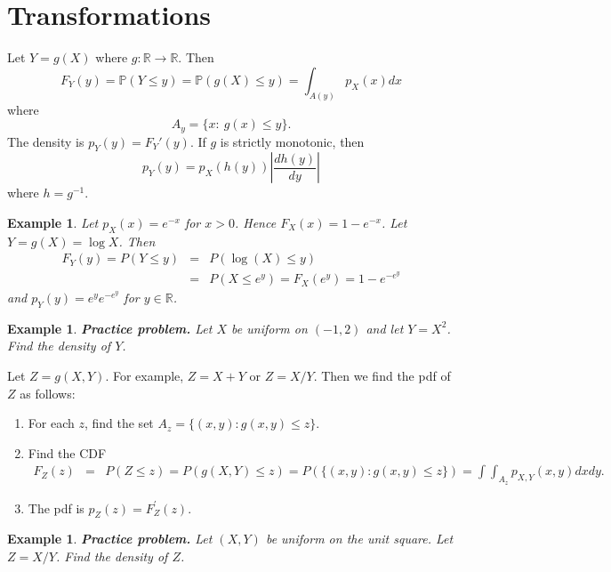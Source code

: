 \documentclass[twoside,12pt]{article}
\newtheorem{example}[theorem]{Example}
\begin{document}
\section{Transformations}

Let $Y=g(X)$
where $g:\mathbb{R}\to \mathbb{R}$.
Then
$$
F_Y(y) = \mathbb{P}(Y \leq y) = \mathbb{P}(g(X) \leq y) = \int_{A(y)} p_X(x) dx
$$
where
$$
A_y = \{ x:\ g(x) \leq y\}.
$$
The density is
$p_Y(y) = F_Y'(y)$.
If $g$ is strictly monotonic, then
$$
p_Y(y) =  p_X(h(y)) \left|\frac{d h(y)}{dy} \right|
$$
where $h=g^{-1}$.


\begin{example}
Let $p_X(x)=e^{-x}$ for $x>0$.  Hence
$F_X(x) = 1-e^{-x}$.  Let $Y=g(X) = \log X$.  Then 
\begin{eqnarray*} 
F_Y(y) = P(Y \leq y) &=& P(\log(X) \leq y) \\
&=& P(X \leq e^y) = F_X(e^y) = 1-e^{-e^y}
\end{eqnarray*}
and
$p_Y(y) = e^{y} e^{-e^y}$ for
$y\in \mathbb{R}$.
\end{example}


\begin{example}
{\bf Practice problem.}
Let $X$ be uniform on $(-1,2)$ and let
$Y = X^2$.
Find the density of $Y$.
\end{example}

\vspace{1cm}

Let $Z = g(X,Y)$.
For example,
$Z=X+Y$ or $Z=X/Y$.
Then we find the pdf of $Z$ as follows:

\begin{enumerate}
\item For each $z$, find the set $A_z=\{(x,y):g(x,y) \leq z\}$.
\item Find the CDF
\begin{eqnarray*}
F_Z(z) &=& P(Z \leq z) = P(g(X,Y) \leq z) = P(\{(x,y):g(x,y) \leq z\}) =
\int\int_{A_z} p_{X,Y}(x,y)dxdy.
\end{eqnarray*}
\item The pdf is $p_{Z}(z) = F_Z^\prime(z)$.
\end{enumerate}

\begin{example}
{\bf Practice problem.}
Let $(X,Y)$ be uniform on the unit square.
Let $Z=X/Y$.
Find the density of $Z$.
\end{example}
\end{document}
